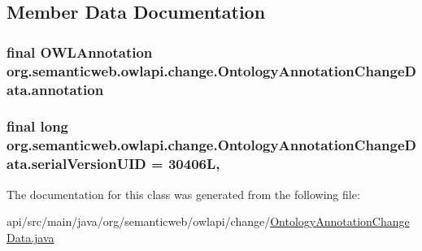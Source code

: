 \subsection{Member Data Documentation}
\hypertarget{classorg_1_1semanticweb_1_1owlapi_1_1change_1_1_ontology_annotation_change_data_a9adc959d9ad5bcdce1eee5141c22e3af}{
\subsubsection[{annotation}]{\setlength{\rightskip}{0pt plus 5cm}final {\bf O\-W\-L\-Annotation} org.\-semanticweb.\-owlapi.\-change.\-Ontology\-Annotation\-Change\-Data.\-annotation\hspace{0.3cm}{\ttfamily [private]}}}\label{classorg_1_1semanticweb_1_1owlapi_1_1change_1_1_ontology_annotation_change_data_a9adc959d9ad5bcdce1eee5141c22e3af}
\hypertarget{classorg_1_1semanticweb_1_1owlapi_1_1change_1_1_ontology_annotation_change_data_afe5edce9c663d2212beaa81bf0803e53}{
\subsubsection[{serial\-Version\-U\-I\-D}]{\setlength{\rightskip}{0pt plus 5cm}final long org.\-semanticweb.\-owlapi.\-change.\-Ontology\-Annotation\-Change\-Data.\-serial\-Version\-U\-I\-D = 30406\-L\hspace{0.3cm}{\ttfamily [static]}, {\ttfamily [private]}}}\label{classorg_1_1semanticweb_1_1owlapi_1_1change_1_1_ontology_annotation_change_data_afe5edce9c663d2212beaa81bf0803e53}


The documentation for this class was generated from the following file\-:\begin{DoxyCompactItemize}
\item 
api/src/main/java/org/semanticweb/owlapi/change/\hyperlink{_ontology_annotation_change_data_8java}{Ontology\-Annotation\-Change\-Data.\-java}\end{DoxyCompactItemize}
